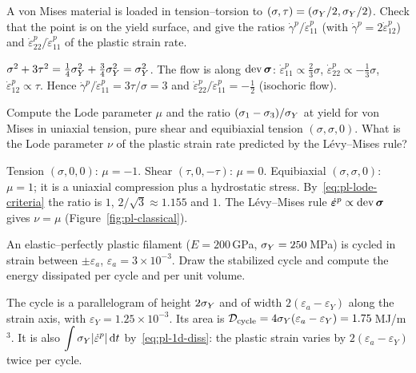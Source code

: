 \label{exo:pl-sq-normality}
%
A von Mises material is loaded in tension--torsion to
$(\sigma,\tau)=(\sigma_{Y}/2,\sigma_{Y}/2)$. Check that the point is on the yield surface,
and give the ratios $\dot\gamma^p/\dot\varepsilon^p_{11}$ (with
$\dot\gamma^p=2\dot\varepsilon^p_{12}$) and
$\dot\varepsilon^p_{22}/\dot\varepsilon^p_{11}$ of the plastic strain rate.
\begin{solution}
$\sigma^2+3\tau^2=\tfrac14\sigma_{Y}^2+\tfrac34\sigma_{Y}^2=\sigma_{Y}^2$. The flow is along
$\operatorname{dev}\bm{\sigma}$: $\dot\varepsilon^p_{11}\propto\tfrac23\sigma$,
$\dot\varepsilon^p_{22}\propto-\tfrac13\sigma$, $\dot\varepsilon^p_{12}\propto\tau$.
Hence $\dot\gamma^p/\dot\varepsilon^p_{11}=3\tau/\sigma=3$ and
$\dot\varepsilon^p_{22}/\dot\varepsilon^p_{11}=-\tfrac12$ (isochoric flow).
\end{solution}

\label{exo:pl-sq-lode}
%
Compute the Lode parameter $\mu$ and the ratio $(\sigma_1-\sigma_3)/\sigma_{Y}$ at
yield for von Mises in uniaxial tension, pure shear and equibiaxial tension
$(\sigma,\sigma,0)$. What is the Lode parameter $\nu$ of the plastic strain
rate predicted by the L\'evy--Mises rule?
\begin{solution}
Tension $(\sigma,0,0)$: $\mu=-1$. Shear $(\tau,0,-\tau)$: $\mu=0$. Equibiaxial
$(\sigma,\sigma,0)$: $\mu=1$; it is a uniaxial compression plus a hydrostatic
stress. By~\eqref{eq:pl-lode-criteria} the ratio is $1$,
$2/\sqrt3\approx1.155$ and $1$. The L\'evy--Mises rule
$\dot{\bm{\varepsilon}}^p\propto\operatorname{dev}\bm{\sigma}$ gives $\nu=\mu$ (Figure~\ref{fig:pl-classical}).
\end{solution}

\label{exo:pl-sq-cycle}
%
An elastic--perfectly plastic filament ($E=200$\,GPa, $\sigma_{Y}=250$\,MPa) is
cycled in strain between $\pm\varepsilon_a$, $\varepsilon_a=3\times10^{-3}$.
Draw the stabilized cycle and compute the energy dissipated per cycle and per
unit volume.
\begin{solution}
The cycle is a parallelogram of height $2\sigma_{Y}$ and of width
$2(\varepsilon_a-\varepsilon_Y)$ along the strain axis, with
$\varepsilon_Y=1.25\times10^{-3}$. Its area is
$\mathcal D_{\mathrm{cycle}}=4\sigma_{Y}(\varepsilon_a-\varepsilon_Y)=1.75$\,MJ/m$^3$.
It is also $\displaystyle \int\sigma_{Y}|\dot\varepsilon^p|\,\mathrm{d} t$ by~\eqref{eq:pl-1d-diss}: the
plastic strain varies by $2(\varepsilon_a-\varepsilon_Y)$ twice per cycle.
\end{solution}

